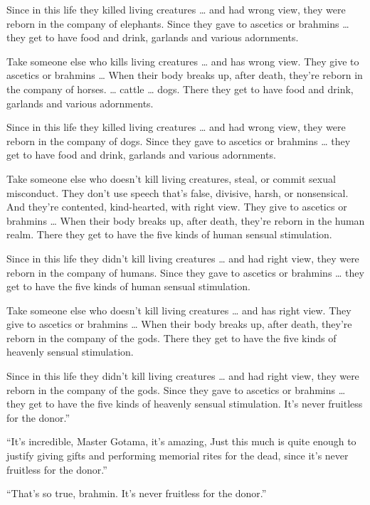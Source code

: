 \documentclass[12pt,openany]{book}%
\begin{document}
Since in this life they killed living creatures … and had wrong view, they were reborn in the company of elephants. Since they gave to ascetics or brahmins … they get to have food and drink, garlands and various adornments. 

Take someone else who kills living creatures … and has wrong view. They give to ascetics or brahmins … When their body breaks up, after death, they’re reborn in the company of horses. … cattle … dogs. There they get to have food and drink, garlands and various adornments. 

Since in this life they killed living creatures … and had wrong view, they were reborn in the company of dogs. Since they gave to ascetics or brahmins … they get to have food and drink, garlands and various adornments. 

Take someone else who doesn’t kill living creatures, steal, or commit sexual misconduct. They don’t use speech that’s false, divisive, harsh, or nonsensical. And they’re contented, kind-hearted, with right view. They give to ascetics or brahmins … When their body breaks up, after death, they’re reborn in the human realm. There they get to have the five kinds of human sensual stimulation. 

Since in this life they didn’t kill living creatures … and had right view, they were reborn in the company of humans. Since they gave to ascetics or brahmins … they get to have the five kinds of human sensual stimulation. 

Take someone else who doesn’t kill living creatures … and has right view. They give to ascetics or brahmins … When their body breaks up, after death, they’re reborn in the company of the gods. There they get to have the five kinds of heavenly sensual stimulation. 

Since in this life they didn’t kill living creatures … and had right view, they were reborn in the company of the gods. Since they gave to ascetics or brahmins … they get to have the five kinds of heavenly sensual stimulation. It’s never fruitless for the donor.” 

“It’s incredible, Master Gotama, it’s amazing, Just this much is quite enough to justify giving gifts and performing memorial rites for the dead, since it’s never fruitless for the donor.” 

“That’s so true, brahmin. It’s never fruitless for the donor.” 
\end{document}
